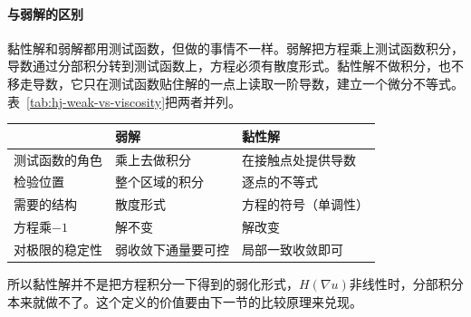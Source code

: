 \paragraph{与弱解的区别}
黏性解和弱解都用测试函数，但做的事情不一样。弱解把方程乘上测试函数积分，导数通过分部积分转到测试函数上，方程必须有散度形式。黏性解不做积分，也不移走导数，它只在测试函数贴住解的一点上读取一阶导数，建立一个微分不等式。表~\ref{tab:hj-weak-vs-viscosity}把两者并列。

\begin{BookInlineTable}
  \centering
  \begin{tabular}{lll}
    \toprule
    & 弱解 & 黏性解\\
    \midrule
    测试函数的角色 & 乘上去做积分 & 在接触点处提供导数\\
    检验位置 & 整个区域的积分 & 逐点的不等式\\
    需要的结构 & 散度形式 & 方程的符号（单调性）\\
    方程乘$-1$ & 解不变 & 解改变\\
    对极限的稳定性 & 弱收敛下通量要可控 & 局部一致收敛即可\\
    \bottomrule
  \end{tabular}
  \caption{弱解与黏性解的对比。}
  \label{tab:hj-weak-vs-viscosity}
\end{BookInlineTable}

所以黏性解并不是把方程积分一下得到的弱化形式，$H(\nabla u)$非线性时，分部积分本来就做不了。这个定义的价值要由下一节的比较原理来兑现。
